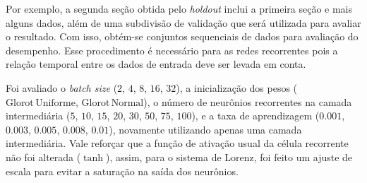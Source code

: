 \documentclass{article}
\newcommand{\glorot}{\text{Glorot}}
\newcommand{\normal}{\text{Normal}}
\newcommand{\uniform}{\text{Uniforme}}
\begin{document}
Por exemplo, a segunda seção obtida pelo \textit{holdout} inclui a primeira seção e mais alguns dados, além de uma subdivisão de validação que será utilizada para avaliar o resultado. Com isso, obtém-se conjuntos sequenciais de dados para avaliação do desempenho. Esse procedimento é necessário para as redes recorrentes pois a relação temporal entre os dados de entrada deve ser levada em conta.

Foi avaliado o \textit{batch size} ($2$, $4$, $8$, $16$, $32$), a inicialização dos pesos ($\glorot \, \uniform$, $\glorot \, \normal$), o número de neurônios recorrentes na camada intermediária ($5$, $10$, $15$, $20$, $30$, $50$, $75$, $100$), e a taxa de aprendizagem ($0.001$, $0.003$, $0.005$, $0.008$, $0.01$), novamente utilizando apenas uma camada intermediária. Vale reforçar que a função de ativação usual da célula recorrente não foi alterada ($\tanh$), assim, para o sistema de Lorenz, foi feito um ajuste de escala para evitar a saturação na saída dos neurônios.
\end{document}
